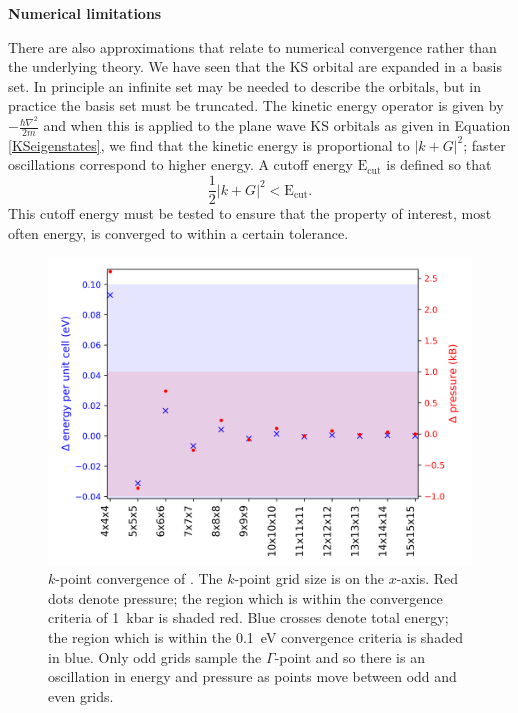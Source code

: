 \textbf{Numerical limitations} 

There are also approximations that relate to numerical convergence rather than the underlying theory.
We have seen that the KS orbital are expanded in a basis set. In principle an infinite set may be needed to describe the orbitals, but in practice the basis set must be truncated. The kinetic energy operator is given by $-\frac{\hbar \nabla^2}{2m}$ and when this is applied to the plane wave KS orbitals as given in Equation \ref{KSeigenstates}, we find that the kinetic energy is proportional to $|k+G|^2$; faster oscillations correspond to higher energy. A cutoff energy $\textrm{E}_\textrm{cut}$ is defined so that
\begin{equation}
\frac{1}{2}|k+G|^2 < \textrm{E}_\textrm{cut}.
\end{equation}
This cutoff energy must be tested to ensure that the property of interest, most often energy, is converged to within a certain tolerance.

\begin{figure}[h]
\centering
  \includegraphics[width=0.7\columnwidth]{figures/ch3/kpointconvergence.png}
  \caption[ $k$-point convergence]{$k$-point convergence of . The $k$-point grid size is on the $x$-axis. Red dots denote pressure; the region which is within the convergence criteria of \SI{1}{\kilo\bar} is shaded red. Blue crosses denote total energy; the region which is within the \SI{0.1}{\electronvolt} convergence criteria is shaded in blue. Only odd grids sample the $\Gamma$-point and so there is an oscillation in energy and pressure as points move between odd and even grids.}
  \label{kpointconvergence}
\end{figure}

